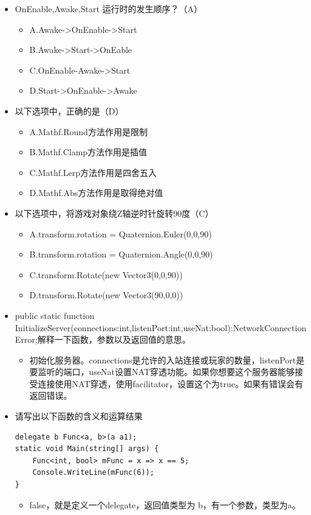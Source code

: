 \documentclass[9pt, b5paper]{article}
\begin{document}
\begin{itemize}
\begin{itemize}
\end{itemize}
\item OnEnable,Awake,Start 运行时的发生顺序？（A）
\begin{itemize}
\item A.Awake->OnEnable->Start
\item B.Awake->Start->OnEable
\item C.OnEnable-Awake->Start
\item D.Start->OnEnable->Awake
\end{itemize}
\item 以下选项中，正确的是（D）
\begin{itemize}
\item A.Mathf.Round方法作用是限制
\item B.Mathf.Clamp方法作用是插值
\item C.Mathf.Lerp方法作用是四舍五入
\item D.Mathf.Abs方法作用是取得绝对值
\end{itemize}
\item 以下选项中，将游戏对象绕Z轴逆时针旋转90度（C）
\begin{itemize}
\item A.transform.rotation = Quaternion.Euler(0,0,90)
\item B.transform.rotation = Quaternion.Angle(0,0,90)
\item C.transform.Rotate(new Vector3(0,0,90))
\item D.transform.Rotate(new Vector3(90,0,0))
\end{itemize}
\item public static function InitializeServer(connections:int,listenPort:int,useNat:bool):NetworkConnectionError;解释一下函数，参数以及返回值的意思。
\begin{itemize}
\item 初始化服务器。connections是允许的入站连接或玩家的数量，listenPort是要监听的端口，useNat设置NAT穿透功能。如果你想要这个服务器能够接受连接使用NAT穿透，使用facilitator，设置这个为true。如果有错误会有返回错误。
\end{itemize}
\item 请写出以下函数的含义和运算结果
\begin{verbatim}
delegate b Func<a, b>(a a1);
static void Main(string[] args) {
    Func<int, bool> mFunc = x => x == 5;
    Console.WriteLine(mFunc(6));
}
\end{verbatim}
\begin{itemize}
\item false，就是定义一个delegate，返回值类型为 b，有一个参数，类型为a。

\end{itemize}
\end{itemize}
\end{document}
